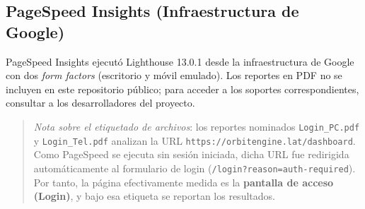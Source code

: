\subsection{PageSpeed Insights (Infraestructura de Google)}\label{pagespeed-insights-infraestructura-de-google}

PageSpeed Insights ejecutó Lighthouse 13.0.1 desde la infraestructura de Google con dos \emph{form factors} (escritorio y móvil emulado). Los reportes en PDF no se incluyen en este repositorio público; para acceder a los soportes correspondientes, consultar a los desarrolladores del proyecto.

\begin{quote}
\emph{Nota sobre el etiquetado de archivos}: los reportes nominados \texttt{Login\_PC.pdf} y \texttt{Login\_Tel.pdf} analizan la URL \texttt{https://orbitengine.lat/dashboard}. Como PageSpeed se ejecuta sin sesión iniciada, dicha URL fue redirigida automáticamente al formulario de login (\texttt{/login?reason=auth-required}). Por tanto, la página efectivamente medida es la \textbf{pantalla de acceso (Login)}, y bajo esa etiqueta se reportan los resultados.
\end{quote}


